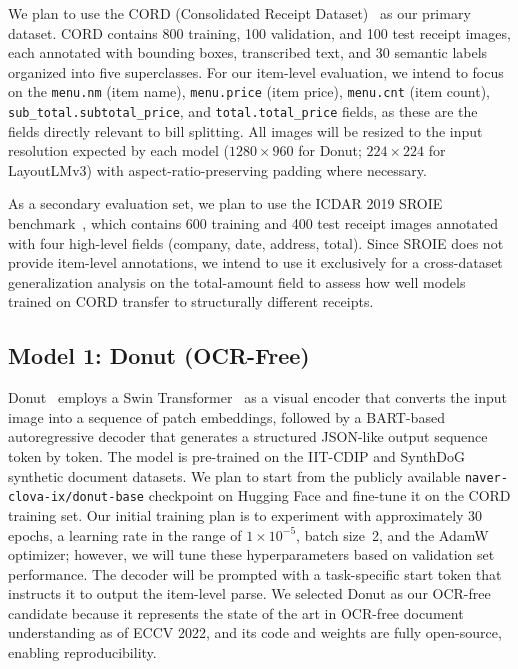 \documentclass[9pt,twocolumn,twoside]{extarticle}
\begin{document}
We plan to use the CORD (Consolidated Receipt Dataset)~\cite{park2019cord} as our primary dataset. CORD contains 800 training, 100 validation, and 100 test receipt images, each annotated with bounding boxes, transcribed text, and 30 semantic labels organized into five superclasses. For our item-level evaluation, we intend to focus on the \texttt{menu.nm} (item name), \texttt{menu.price} (item price), \texttt{menu.cnt} (item count), \texttt{sub\_total.subtotal\_price}, and \texttt{total.total\_price} fields, as these are the fields directly relevant to bill splitting. All images will be resized to the input resolution expected by each model ($1280{\times}960$ for Donut; $224{\times}224$ for LayoutLMv3) with aspect-ratio-preserving padding where necessary.

As a secondary evaluation set, we plan to use the ICDAR 2019 SROIE benchmark~\cite{huang2019sroie}, which contains 600 training and 400 test receipt images annotated with four high-level fields (company, date, address, total). Since SROIE does not provide item-level annotations, we intend to use it exclusively for a cross-dataset generalization analysis on the total-amount field to assess how well models trained on CORD transfer to structurally different receipts.

\subsection{Model 1: Donut (OCR-Free)}
\label{sec:donut}

Donut~\cite{kim2022donut} employs a Swin Transformer~\cite{liu2021swin} as a visual encoder that converts the input image into a sequence of patch embeddings, followed by a BART-based autoregressive decoder that generates a structured JSON-like output sequence token by token. The model is pre-trained on the IIT-CDIP and SynthDoG synthetic document datasets. We plan to start from the publicly available \texttt{naver-clova-ix/donut-base} checkpoint on Hugging Face and fine-tune it on the CORD training set. Our initial training plan is to experiment with approximately 30 epochs, a learning rate in the range of $1 \times 10^{-5}$, batch size~2, and the AdamW optimizer; however, we will tune these hyperparameters based on validation set performance. The decoder will be prompted with a task-specific start token that instructs it to output the item-level parse. We selected Donut as our OCR-free candidate because it represents the state of the art in OCR-free document understanding as of ECCV 2022, and its code and weights are fully open-source, enabling reproducibility.
\end{document}
